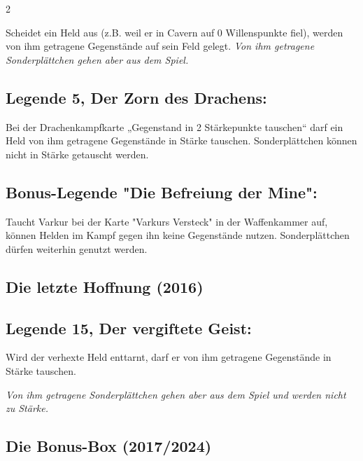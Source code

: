 \documentclass[10pt, a4paper, oneside]{book}
\newcommand{\fan}[1]{\textit{#1}}
\begin{document}
\begin{multicols*}{2}
\begin{bgcolor}
Scheidet ein Held aus (z.B. weil er in Cavern auf 0 Willenspunkte fiel), werden von ihm getragene Gegenstände auf sein Feld gelegt. \fan{Von ihm getragene Sonderplättchen gehen aber aus dem Spiel.}


\subsection{Legende 5, Der Zorn des Drachens:}

Bei der Drachenkampfkarte „Gegenstand in 2 Stärkepunkte tauschen“ darf ein Held von ihm getragene Gegenstände in Stärke tauschen. Sonderplättchen können nicht in Stärke getauscht werden.
\supercite{6952}

\subsection{Bonus-Legende "Die Befreiung der Mine":}

Taucht Varkur bei der Karte "Varkurs Versteck" in der Waffenkammer auf, können Helden im Kampf gegen ihn keine Gegenstände nutzen. Sonderplättchen dürfen weiterhin genutzt werden.
\supercite{6952}



\end{bgcolor}


\begin{bgcolor}
\section{Die letzte Hoffnung (2016)}


\subsection{Legende 15, Der vergiftete Geist:}

Wird der verhexte Held enttarnt, darf er von ihm getragene Gegenstände in Stärke tauschen.
\supercite{DlH15:Verhext?}

\fan{Von ihm getragene Sonderplättchen gehen aber aus dem Spiel und werden nicht zu Stärke.}

\end{bgcolor}


\begin{bgcolor}[color-BB]
\section{Die Bonus-Box (2017/2024)}


\end{bgcolor}
\end{multicols*}
\end{document}
